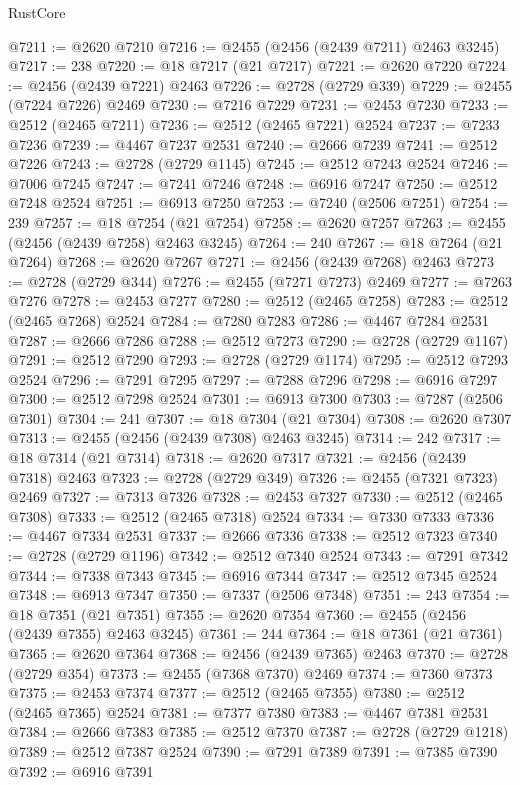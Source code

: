 \begin{lexlean}{RustCore}
\begin{coremodule}
@7211 := @2620 @7210
@7216 := @2455 (@2456 (@2439 @7211) @2463 @3245)
@7217 := 238
@7220 := @18 @7217 (@21 @7217)
@7221 := @2620 @7220
@7224 := @2456 (@2439 @7221) @2463
@7226 := @2728 (@2729 @339)
@7229 := @2455 (@7224 @7226) @2469
@7230 := @7216 @7229
@7231 := @2453 @7230
@7233 := @2512 (@2465 @7211)
@7236 := @2512 (@2465 @7221) @2524
@7237 := @7233 @7236
@7239 := @4467 @7237 @2531
@7240 := @2666 @7239
@7241 := @2512 @7226
@7243 := @2728 (@2729 @1145)
@7245 := @2512 @7243 @2524
@7246 := @7006 @7245
@7247 := @7241 @7246
@7248 := @6916 @7247
@7250 := @2512 @7248 @2524
@7251 := @6913 @7250
@7253 := @7240 (@2506 @7251)
@7254 := 239
@7257 := @18 @7254 (@21 @7254)
@7258 := @2620 @7257
@7263 := @2455 (@2456 (@2439 @7258) @2463 @3245)
@7264 := 240
@7267 := @18 @7264 (@21 @7264)
@7268 := @2620 @7267
@7271 := @2456 (@2439 @7268) @2463
@7273 := @2728 (@2729 @344)
@7276 := @2455 (@7271 @7273) @2469
@7277 := @7263 @7276
@7278 := @2453 @7277
@7280 := @2512 (@2465 @7258)
@7283 := @2512 (@2465 @7268) @2524
@7284 := @7280 @7283
@7286 := @4467 @7284 @2531
@7287 := @2666 @7286
@7288 := @2512 @7273
@7290 := @2728 (@2729 @1167)
@7291 := @2512 @7290
@7293 := @2728 (@2729 @1174)
@7295 := @2512 @7293 @2524
@7296 := @7291 @7295
@7297 := @7288 @7296
@7298 := @6916 @7297
@7300 := @2512 @7298 @2524
@7301 := @6913 @7300
@7303 := @7287 (@2506 @7301)
@7304 := 241
@7307 := @18 @7304 (@21 @7304)
@7308 := @2620 @7307
@7313 := @2455 (@2456 (@2439 @7308) @2463 @3245)
@7314 := 242
@7317 := @18 @7314 (@21 @7314)
@7318 := @2620 @7317
@7321 := @2456 (@2439 @7318) @2463
@7323 := @2728 (@2729 @349)
@7326 := @2455 (@7321 @7323) @2469
@7327 := @7313 @7326
@7328 := @2453 @7327
@7330 := @2512 (@2465 @7308)
@7333 := @2512 (@2465 @7318) @2524
@7334 := @7330 @7333
@7336 := @4467 @7334 @2531
@7337 := @2666 @7336
@7338 := @2512 @7323
@7340 := @2728 (@2729 @1196)
@7342 := @2512 @7340 @2524
@7343 := @7291 @7342
@7344 := @7338 @7343
@7345 := @6916 @7344
@7347 := @2512 @7345 @2524
@7348 := @6913 @7347
@7350 := @7337 (@2506 @7348)
@7351 := 243
@7354 := @18 @7351 (@21 @7351)
@7355 := @2620 @7354
@7360 := @2455 (@2456 (@2439 @7355) @2463 @3245)
@7361 := 244
@7364 := @18 @7361 (@21 @7361)
@7365 := @2620 @7364
@7368 := @2456 (@2439 @7365) @2463
@7370 := @2728 (@2729 @354)
@7373 := @2455 (@7368 @7370) @2469
@7374 := @7360 @7373
@7375 := @2453 @7374
@7377 := @2512 (@2465 @7355)
@7380 := @2512 (@2465 @7365) @2524
@7381 := @7377 @7380
@7383 := @4467 @7381 @2531
@7384 := @2666 @7383
@7385 := @2512 @7370
@7387 := @2728 (@2729 @1218)
@7389 := @2512 @7387 @2524
@7390 := @7291 @7389
@7391 := @7385 @7390
@7392 := @6916 @7391

\end{coremodule}
\end{lexlean}
